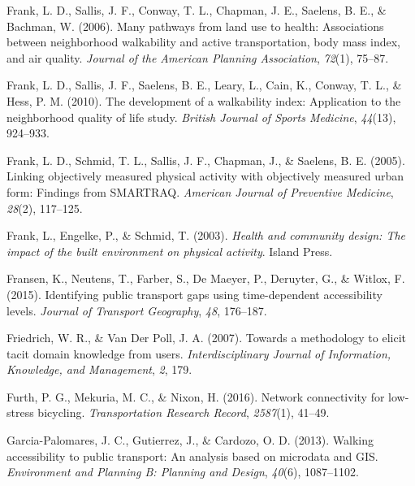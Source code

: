 \documentclass[12pt,twoside]{reedthesis}
\newlength{\cslhangindent}
\newenvironment{CSLReferences}[2] %
 {%
  \setlength{\parindent}{0pt}
  \ifodd #1 \everypar{\setlength{\hangindent}{\cslhangindent}}\ignorespaces\fi
  \ifnum #2 > 0
  \setlength{\parskip}{#2\baselineskip}
  \fi
 }%
 {}
\begin{document}
\begin{CSLReferences}{1}{0}
\leavevmode{}%
Frank, L. D., Sallis, J. F., Conway, T. L., Chapman, J. E., Saelens, B. E., \& Bachman, W. (2006). Many pathways from land use to health: Associations between neighborhood walkability and active transportation, body mass index, and air quality. \emph{Journal of the American Planning Association}, \emph{72}(1), 75--87.

\leavevmode{}%
Frank, L. D., Sallis, J. F., Saelens, B. E., Leary, L., Cain, K., Conway, T. L., \& Hess, P. M. (2010). The development of a walkability index: Application to the neighborhood quality of life study. \emph{British Journal of Sports Medicine}, \emph{44}(13), 924--933.

\leavevmode{}%
Frank, L. D., Schmid, T. L., Sallis, J. F., Chapman, J., \& Saelens, B. E. (2005). Linking objectively measured physical activity with objectively measured urban form: Findings from SMARTRAQ. \emph{American Journal of Preventive Medicine}, \emph{28}(2), 117--125.

\leavevmode{}%
Frank, L., Engelke, P., \& Schmid, T. (2003). \emph{Health and community design: The impact of the built environment on physical activity}. Island Press.

\leavevmode{}%
Fransen, K., Neutens, T., Farber, S., De Maeyer, P., Deruyter, G., \& Witlox, F. (2015). Identifying public transport gaps using time-dependent accessibility levels. \emph{Journal of Transport Geography}, \emph{48}, 176--187.

\leavevmode{}%
Friedrich, W. R., \& Van Der Poll, J. A. (2007). Towards a methodology to elicit tacit domain knowledge from users. \emph{Interdisciplinary Journal of Information, Knowledge, and Management}, \emph{2}, 179.

\leavevmode{}%
Furth, P. G., Mekuria, M. C., \& Nixon, H. (2016). Network connectivity for low-stress bicycling. \emph{Transportation Research Record}, \emph{2587}(1), 41--49.

\leavevmode{}%
Garcia-Palomares, J. C., Gutierrez, J., \& Cardozo, O. D. (2013). Walking accessibility to public transport: An analysis based on microdata and GIS. \emph{Environment and Planning B: Planning and Design}, \emph{40}(6), 1087--1102.


\end{CSLReferences}
\end{document}
